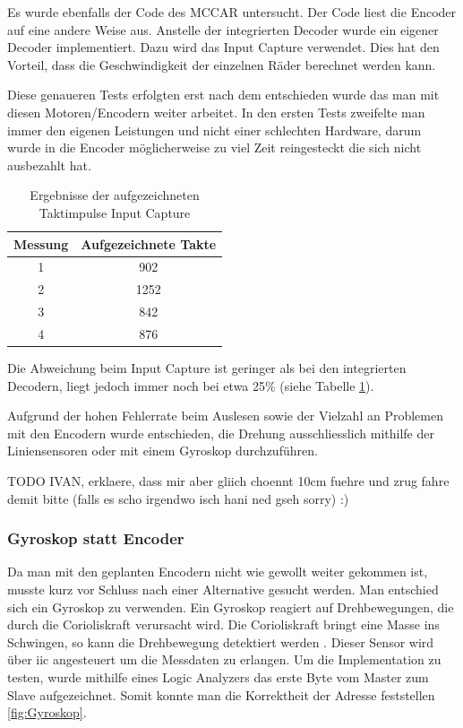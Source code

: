 Es wurde ebenfalls der Code des MCCAR untersucht. Der Code liest die Encoder auf eine andere Weise aus. Anstelle der integrierten Decoder wurde ein eigener Decoder implementiert. Dazu wird das Input Capture verwendet. Dies hat den Vorteil, dass die Geschwindigkeit der einzelnen Räder berechnet werden kann.


Diese genaueren Tests erfolgten erst nach dem entschieden wurde das man mit diesen Motoren/Encodern weiter arbeitet. In den ersten Tests zweifelte man immer den eigenen Leistungen und nicht einer schlechten Hardware, darum wurde in die Encoder möglicherweise zu viel Zeit reingesteckt die sich nicht ausbezahlt hat.

\begin{table}[ht]
\centering
\caption{Ergebnisse der aufgezeichneten Taktimpulse Input Capture}
\label{tab:taktergebnisse_im}
\begin{tabular}{|c|c|}
\hline
\textbf{Messung} & \textbf{Aufgezeichnete Takte} \\
\hline
1 & 902 \\
2 & 1252 \\
3 & 842 \\
4 & 876 \\
\hline
\end{tabular}
\end{table}

Die Abweichung beim Input Capture ist geringer als bei den integrierten Decodern, liegt jedoch immer noch bei etwa 25\% (siehe Tabelle \ref{tab:taktergebnisse_im}).

Aufgrund der hohen Fehlerrate beim Auslesen sowie der Vielzahl an Problemen mit den Encodern wurde entschieden, die Drehung ausschliesslich mithilfe der Liniensensoren oder mit einem Gyroskop durchzuführen.

TODO IVAN, erklaere, dass mir aber gliich choennt 10cm fuehre und zrug fahre demit bitte (falls es scho irgendwo isch hani ned gseh sorry) :)

\subsubsection{Gyroskop statt Encoder}

Da man mit den geplanten Encodern nicht wie gewollt weiter gekommen ist, musste kurz vor Schluss nach einer Alternative gesucht werden. Man entschied sich ein Gyroskop zu verwenden. Ein Gyroskop reagiert auf Drehbewegungen, die durch die Corioliskraft verursacht wird. Die Corioliskraft bringt eine Masse ins Schwingen, so kann die Drehbewegung detektiert werden \parencite{zielke2025}. Dieser Sensor wird über \acrshort{iic} angesteuert um die Messdaten zu erlangen. Um die Implementation zu testen, wurde mithilfe eines Logic Analyzers das erste Byte vom Master zum Slave aufgezeichnet. Somit konnte man die Korrektheit der Adresse feststellen \ref{fig:Gyroskop}. 

